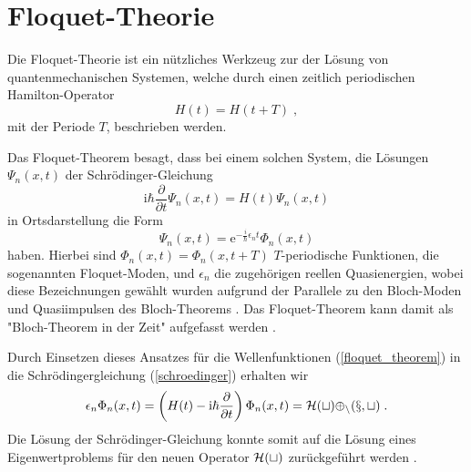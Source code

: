 \chapter{Floquet-Theorie}


  Die Floquet-Theorie \cite{haengi} ist ein nützliches Werkzeug zur der Lösung von quantenmechanischen Systemen, welche durch einen zeitlich periodischen Hamilton-Operator
  \begin{equation}
    H(t) = H(t+T) \; ,
  \end{equation}
  mit der Periode $T$, beschrieben werden.

  Das Floquet-Theorem besagt, dass bei einem solchen System, die Lösungen $\Psi_n(x,t)$ der Schrödinger-Gleichung
  \begin{equation}
    \text{i}\hbar\frac{\partial}{\partial t}\Psi_n(x,t) = H(t)\Psi_n(x,t)
    \label{schroedinger}
  \end{equation}
  in Ortsdarstellung die Form
  \begin{equation}
    \Psi_n(x,t) = \text{e}^{-\frac{i}{\hbar}\epsilon_nt}\Phi_n(x,t)
    \label{floquet_theorem}
  \end{equation}
  haben.
  Hierbei sind $\Phi_n(x,t) = \Phi_n(x,t+T)$ $T$-periodische Funktionen, die sogenannten Floquet-Moden, und $\epsilon_n$ die zugehörigen reellen Quasienergien, wobei diese Bezeichnungen gewählt wurden aufgrund der Parallele zu den Bloch-Moden und Quasiimpulsen des Bloch-Theorems \cite{haengi}.
  Das Floquet-Theorem kann damit als "Bloch-Theorem in der Zeit" aufgefasst werden \cite{sherly}.

  Durch Einsetzen dieses Ansatzes für die Wellenfunktionen (\ref{floquet_theorem}) in die Schrödingergleichung (\ref{schroedinger}) erhalten wir
  \begin{equation}
    \epsilon_n \Phi_n(x,t) = \left(H(t)-\text{i}\hbar\frac{\partial}{\partial t}\right)\Phi_n(x,t) = \cal{H}(t) \Phi_n(x,t) \; .
    \label{eigenwertproblem}
  \end{equation}
  Die Lösung der Schrödinger-Gleichung konnte somit auf die Lösung eines Eigenwertproblems für den neuen Operator $\cal{H}(t)$ zurückgeführt werden \cite{sherly}.


